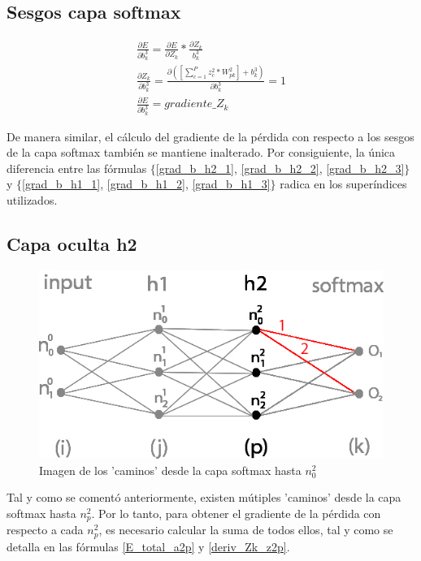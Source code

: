 \subsection{Sesgos capa softmax}

\begin{gather}
	\frac{\partial E}{\partial b^3_k} = \frac{\partial E}{\partial Z_k} * \frac{\partial Z_k}{b^3_k} \label{grad_b_h2_1} \\
	\frac{\partial Z_k }{\partial b^3_k } = \frac{\partial ([\sum_{c=1}^{P} z^2_c * W^2_{pk}] + b^3_k) }{\partial b^3_k } = 1 \label{grad_b_h2_2} \\
	\frac{\partial E}{\partial b^3_k} = gradiente\_Z_k \label{grad_b_h2_3}
\end{gather}

De manera similar, el cálculo del gradiente de la pérdida con respecto a los sesgos de la capa softmax también se mantiene inalterado. Por consiguiente, la única diferencia entre las fórmulas $\{$\ref{grad_b_h2_1}, \ref{grad_b_h2_2}, \ref{grad_b_h2_3}$\}$ y $\{$\ref{grad_b_h1_1}, \ref{grad_b_h1_2}, \ref{grad_b_h1_3}$\}$ radica en los superíndices utilizados.

\subsection{Capa oculta h2}

\begin{figure}[H]
	\centering
	\includegraphics[scale=0.35]{imagenes/nn_h2_caminos_posibles.jpg}  
	\caption{Imagen de los 'caminos' desde la capa softmax hasta $n^2_0$}
	\label{nn_h2_caminos_posibles}
\end{figure}

Tal y como se comentó anteriormente, existen mútiples 'caminos' desde la capa softmax hasta $n^2_p$. Por lo tanto, para obtener el gradiente de la pérdida con respecto a cada $n^2_p$, es necesario calcular la suma de todos ellos, tal y como se detalla en las fórmulas \ref{E_total_a2p} y \ref{deriv_Zk_z2p}. \\

